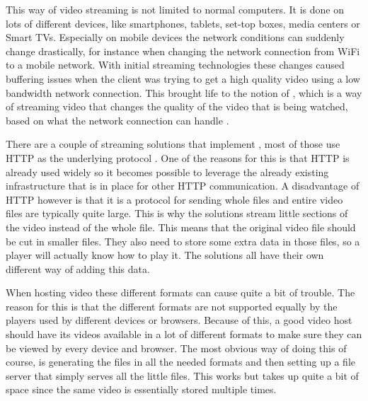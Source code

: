 \documentclass[twoside,openright]{uva-bachelor-thesis}
\begin{document}
This way of video streaming is not limited to normal computers. It is done on
lots of different devices, like smartphones, tablets, set-top boxes,
media centers or Smart TVs. Especially on mobile devices the network conditions
can suddenly change drastically, for instance when changing the network
connection from WiFi to a mobile network. With initial streaming technologies
these changes caused buffering issues when the client was trying to get a high
quality video using a low bandwidth network connection. This brought life to the
notion of \abs, which is a way of streaming video that changes the quality
of the video that is being watched, based on what the network connection can
handle \autocite{abs}.

There are a couple of streaming solutions that implement \abs, most of
those use HTTP as the underlying protocol \autocite{http}.  One of the reasons
for this is that HTTP is already used widely so it becomes possible to
leverage the already existing infrastructure that is in place for other HTTP
communication. A disadvantage of HTTP however is that it is a protocol for
sending whole files and entire video files are typically quite large. This is
why the solutions stream little sections of the video instead of the whole file.
This means that the original video file should be cut in smaller files. They
also need to store some extra data in those files, so a player will actually
know how to play it. The solutions all have their own different way of adding
this data.

When hosting video these different formats can cause quite a bit of trouble.
The reason for this is that the different formats are not supported equally by
the players used by different devices or browsers. Because of this, a good video
host should have its videos available in a lot of different formats to make sure
they can be viewed by every device and browser. The most obvious way of doing
this of course, is generating the files in all the needed formats and then
setting up a file server that simply serves all the little files. This works but
takes up quite a bit of space since the same video is essentially stored
multiple times.
\end{document}
